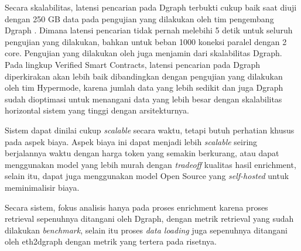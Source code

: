 Secara skalabilitas, latensi pencarian pada Dgraph terbukti cukup baik saat diuji dengan 250 GB data pada pengujian yang dilakukan oleh tim pengembang Dgraph \parencite{hypermode_performance}. Dimana latensi pencarian tidak pernah melebihi 5 detik untuk seluruh pengujian yang dilakukan, bahkan untuk beban 1000 koneksi paralel dengan 2 core. Pengujian yang dilakukan oleh \cite{ashwin2016distributed} juga menjamin dari skalabilitas Dgraph. Pada lingkup Verified Smart Contracts, latensi pencarian pada Dgraph diperkirakan akan lebih baik dibandingkan dengan pengujian yang dilakukan oleh tim Hypermode, karena jumlah data yang lebih sedikit dan juga Dgraph sudah dioptimasi untuk menangani data yang lebih besar dengan skalabilitas horizontal sistem yang tinggi dengan arsitekturnya.


Sistem dapat dinilai cukup \textit{scalable} secara waktu, tetapi butuh perhatian khusus pada aspek biaya. Aspek biaya ini dapat menjadi lebih \textit{scalable} seiring berjalannya waktu dengan harga token yang semakin berkurang, atau dapat menggunakan model yang lebih murah dengan \textit{tradeoff} kualitas hasil enrichment, selain itu, dapat juga menggunakan model Open Source yang \textit{self-hosted} untuk meminimalisir biaya.

Secara sistem, fokus analisis hanya pada proses enrichment karena proses retrieval sepenuhnya ditangani oleh Dgraph, dengan metrik retrieval yang sudah dilakukan \textit{benchmark}, selain itu proses \textit{data loading} juga sepenuhnya ditangani oleh eth2dgraph dengan metrik yang tertera pada risetnya.
